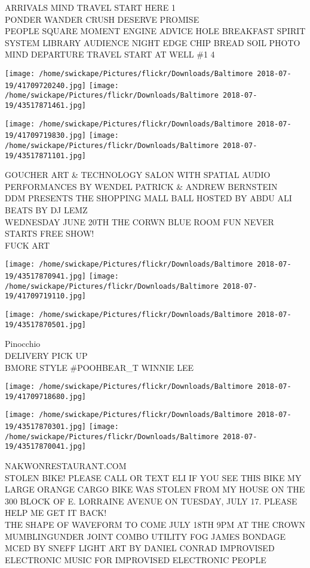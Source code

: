 \documentclass[10pt,letterpaper]{article}
\begin{document}
ARRIVALS MIND TRAVEL START HERE 1\\
PONDER WANDER CRUSH DESERVE PROMISE\\
PEOPLE SQUARE MOMENT ENGINE ADVICE HOLE BREAKFAST SPIRIT SYSTEM LIBRARY AUDIENCE NIGHT EDGE CHIP BREAD SOIL PHOTO\\
MIND DEPARTURE TRAVEL START AT WELL \#1 4
\pagebreak

\texttt{[image: /home/swickape/Pictures/flickr/Downloads/Baltimore 2018-07-19/41709720240.jpg]}
\texttt{[image: /home/swickape/Pictures/flickr/Downloads/Baltimore 2018-07-19/43517871461.jpg]}

\texttt{[image: /home/swickape/Pictures/flickr/Downloads/Baltimore 2018-07-19/41709719830.jpg]}
\texttt{[image: /home/swickape/Pictures/flickr/Downloads/Baltimore 2018-07-19/43517871101.jpg]}

GOUCHER ART \& TECHNOLOGY SALON WITH SPATIAL AUDIO PERFORMANCES BY WENDEL PATRICK \& ANDREW BERNSTEIN\\
DDM PRESENTS THE SHOPPING MALL BALL HOSTED BY ABDU ALI BEATS BY DJ LEMZ\\
WEDNESDAY JUNE 20TH THE CORWN BLUE ROOM FUN NEVER STARTS FREE SHOW!\\
FUCK ART
\pagebreak

\texttt{[image: /home/swickape/Pictures/flickr/Downloads/Baltimore 2018-07-19/43517870941.jpg]}
\texttt{[image: /home/swickape/Pictures/flickr/Downloads/Baltimore 2018-07-19/41709719110.jpg]}

\texttt{[image: /home/swickape/Pictures/flickr/Downloads/Baltimore 2018-07-19/43517870501.jpg]}

Pinocchio\\
DELIVERY PICK UP\\
BMORE STYLE \#POOHBEAR\_T WINNIE LEE
\pagebreak

\texttt{[image: /home/swickape/Pictures/flickr/Downloads/Baltimore 2018-07-19/41709718680.jpg]}

\vspace{0.25in}
\texttt{[image: /home/swickape/Pictures/flickr/Downloads/Baltimore 2018-07-19/43517870301.jpg]}
\texttt{[image: /home/swickape/Pictures/flickr/Downloads/Baltimore 2018-07-19/43517870041.jpg]}

NAKWONRESTAURANT.COM\\
STOLEN BIKE!  PLEASE CALL OR TEXT ELI IF YOU SEE THIS BIKE MY LARGE ORANGE CARGO BIKE WAS STOLEN FROM MY HOUSE ON THE 300 BLOCK OF E. LORRAINE AVENUE ON TUESDAY, JULY 17.  PLEASE HELP ME GET IT BACK!\\
THE SHAPE OF WAVEFORM TO COME JULY 18TH 9PM AT THE CROWN MUMBLINGUNDER JOINT COMBO UTILITY FOG JAMES BONDAGE MCED BY SNEFF LIGHT ART BY DANIEL CONRAD IMPROVISED ELECTRONIC MUSIC FOR IMPROVISED ELECTRONIC PEOPLE
\pagebreak
\end{document}
